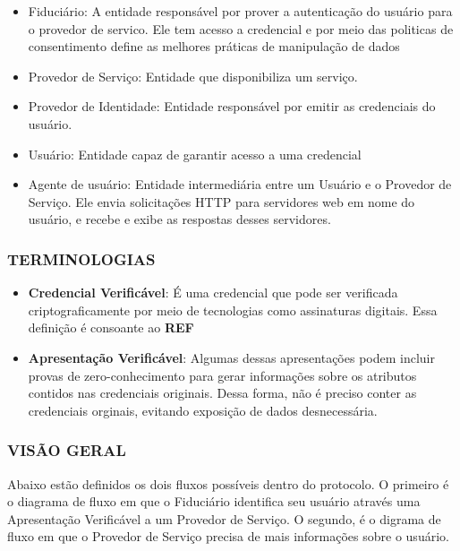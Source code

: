 \begin{itemize}
    \item Fiduciário: A entidade responsável por prover a autenticação do usuário para o provedor de servico. Ele tem acesso a credencial e por meio das politicas de consentimento define as melhores práticas de manipulação de dados
    \item Provedor de Serviço: Entidade que disponibiliza um serviço.
    \item Provedor de Identidade: Entidade responsável por emitir as credenciais do usuário.
    \item Usuário: Entidade capaz de garantir acesso a uma credencial
    \item Agente de usuário: Entidade intermediária entre um Usuário e o Provedor de Serviço. Ele envia solicitações HTTP para servidores web em nome do usuário, e recebe e exibe as respostas desses servidores. 
\end{itemize}

\subsubsection{TERMINOLOGIAS}
\begin{itemize}
    \item \textbf{Credencial Verificável}: É uma credencial que pode ser verificada criptograficamente por meio de tecnologias como assinaturas digitais. Essa definição é consoante ao \textbf{REF}
    \item \textbf{Apresentação Verificável}: Algumas dessas apresentações podem incluir provas de zero-conhecimento para gerar informações sobre os atributos contidos nas credenciais originais. Dessa forma, não é preciso conter as credenciais orginais, evitando exposição de dados desnecessária.
\end{itemize}



\subsubsection{VISÃO GERAL}

Abaixo estão definidos os dois fluxos possíveis dentro do protocolo. O primeiro é o diagrama de fluxo em que o Fiduciário identifica seu usuário através uma Apresentação Verificável a um Provedor de Serviço. O segundo, é o digrama de fluxo em que o Provedor de Serviço precisa de mais informações sobre o usuário. \\ \\


